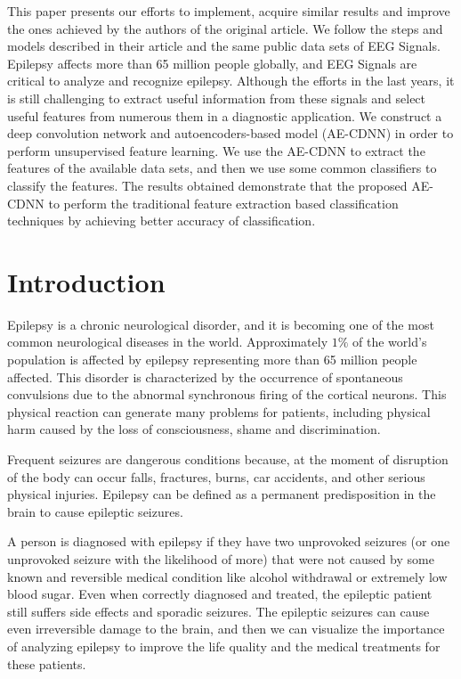 
This paper presents our efforts to implement, acquire similar results and improve the ones achieved by the authors of the original article. We follow the steps and models described in their article and the same public data sets of EEG Signals. Epilepsy affects more than 65 million people globally, and EEG Signals are critical to analyze and recognize epilepsy. Although the efforts in the last years, it is still challenging to extract useful information from these signals and select useful features from numerous them in a diagnostic application. We construct a deep convolution network and autoencoders-based model (AE-CDNN) in order to perform unsupervised feature learning. We use the AE-CDNN to extract the features of the available data sets, and then we use some common classifiers to classify the features. The results obtained demonstrate that the proposed AE-CDNN to perform the traditional feature extraction based classification techniques by achieving better accuracy of classification.

\section{Introduction}

Epilepsy is a chronic neurological disorder, and it is becoming one of the most common neurological diseases in the world. Approximately $1\%$ of the world's population is affected by epilepsy representing more than 65 million people affected. This disorder is characterized by the occurrence of spontaneous convulsions due to the abnormal synchronous firing of the cortical neurons. This physical reaction can generate many problems for patients, including physical harm caused by the loss of consciousness, shame and discrimination.

Frequent seizures are dangerous conditions because, at the moment of disruption of the body can occur falls, fractures, burns, car accidents, and other serious physical injuries. Epilepsy can be defined as a permanent predisposition in the brain to cause epileptic seizures.

A person is diagnosed with epilepsy if they have two unprovoked seizures (or one unprovoked seizure with the likelihood of more) that were not caused by some known and reversible medical condition like alcohol withdrawal or extremely low blood sugar. Even when correctly diagnosed and treated, the epileptic patient still suffers side effects and sporadic seizures. The epileptic seizures can cause even irreversible damage to the brain, and then we can visualize the importance of analyzing epilepsy to improve the life quality and the medical treatments for these patients.


